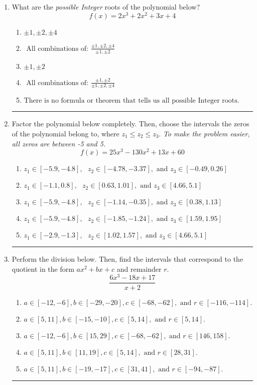 \documentclass[14pt]{extbook}
\newcommand{\litem}[1]{\item#1\hspace*{-1cm}\rule{\textwidth}{0.4pt}}
\begin{document}
\begin{enumerate}
\litem{
What are the \textit{possible Integer} roots of the polynomial below?\[ f(x) = 2x^{3} +2 x^{2} +3 x + 4 \]\begin{enumerate}[label=\Alph*.]
\item \( \pm 1,\pm 2,\pm 4 \)
\item \( \text{ All combinations of: }\frac{\pm 1,\pm 2,\pm 4}{\pm 1,\pm 2} \)
\item \( \pm 1,\pm 2 \)
\item \( \text{ All combinations of: }\frac{\pm 1,\pm 2}{\pm 1,\pm 2,\pm 4} \)
\item \( \text{There is no formula or theorem that tells us all possible Integer roots.} \)

\end{enumerate} }
\litem{
Factor the polynomial below completely. Then, choose the intervals the zeros of the polynomial belong to, where $z_1 \leq z_2 \leq z_3$. \textit{To make the problem easier, all zeros are between -5 and 5.}\[ f(x) = 25x^{3} -130 x^{2} +13 x + 60 \]\begin{enumerate}[label=\Alph*.]
\item \( z_1 \in [-5.9, -4.8], \text{   }  z_2 \in [-4.78, -3.37], \text{   and   } z_3 \in [-0.49, 0.26] \)
\item \( z_1 \in [-1.1, 0.8], \text{   }  z_2 \in [0.63, 1.01], \text{   and   } z_3 \in [4.66, 5.1] \)
\item \( z_1 \in [-5.9, -4.8], \text{   }  z_2 \in [-1.14, -0.35], \text{   and   } z_3 \in [0.38, 1.13] \)
\item \( z_1 \in [-5.9, -4.8], \text{   }  z_2 \in [-1.85, -1.24], \text{   and   } z_3 \in [1.59, 1.95] \)
\item \( z_1 \in [-2.9, -1.3], \text{   }  z_2 \in [1.02, 1.57], \text{   and   } z_3 \in [4.66, 5.1] \)

\end{enumerate} }
\litem{
Perform the division below. Then, find the intervals that correspond to the quotient in the form $ax^2+bx+c$ and remainder $r$.\[ \frac{6x^{3} -18 x + 17}{x + 2} \]\begin{enumerate}[label=\Alph*.]
\item \( a \in [-12, -6], b \in [-29, -20], c \in [-68, -62], \text{ and } r \in [-116, -114]. \)
\item \( a \in [5, 11], b \in [-15, -10], c \in [5, 14], \text{ and } r \in [5, 14]. \)
\item \( a \in [-12, -6], b \in [15, 29], c \in [-68, -62], \text{ and } r \in [146, 158]. \)
\item \( a \in [5, 11], b \in [11, 19], c \in [5, 14], \text{ and } r \in [28, 31]. \)
\item \( a \in [5, 11], b \in [-19, -17], c \in [31, 41], \text{ and } r \in [-94, -87]. \)


\end{enumerate}}
\end{enumerate}
\end{document}

